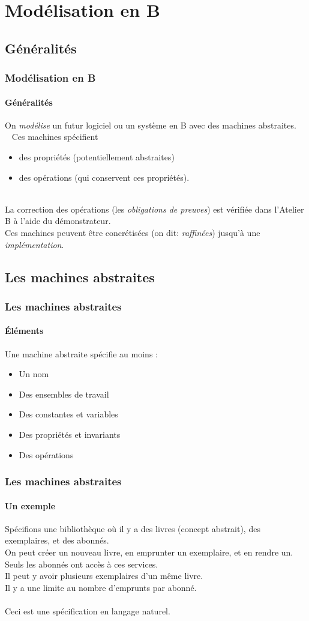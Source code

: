 \documentclass[11pt,a4paper,xcolor=table]{beamer} %
\begin{document}
\section{Modélisation en B}
\subsection{Généralités}
\begin{frame}
\frametitle{Modélisation en B}
\framesubtitle{Généralités}
On \emph{modélise} un futur logiciel ou un système en B avec des machines abstraites.\\[5pt]~\pause
Ces machines spécifient\pause
\begin{itemize}
\item des propriétés (potentiellement abstraites)
\pause
\item des opérations (qui conservent ces propriétés).
\pause
\end{itemize}
~\\[0pt]
La correction des opérations (les \emph{obligations de preuves}) est vérifiée dans l'Atelier B à l'aide du démonstrateur.\pause\\[5pt]
Ces machines peuvent être concrétisées (on dit: \emph{raffinées}) jusqu'à une \emph{implémentation}.
\end{frame}

\subsection{Les machines abstraites}
\begin{frame}
\frametitle{Les machines abstraites}
\framesubtitle{Éléments}
Une machine abstraite spécifie au moins :
\begin{itemize}
\pause
\item Un nom
\pause
\item Des ensembles de travail
\pause
\item Des constantes et variables
\pause
\item Des propriétés et invariants
\pause
\item Des opérations
\end{itemize}
\end{frame}

\begin{frame}
\frametitle{Les machines abstraites}
\framesubtitle{Un exemple}
Spécifions une bibliothèque où il y a des livres (concept abstrait), des exemplaires, et des abonnés.\\\pause
On peut créer un nouveau livre, \pause en emprunter un exemplaire, \pause et en rendre un.
\\\pause Seuls les abonnés ont accès à ces services.
\\\pause Il peut y avoir plusieurs exemplaires d'un même livre.
\\\pause Il y a une limite au nombre d'emprunts par abonné.
\\~\\\pause Ceci est une spécification en langage naturel.
\end{frame}
\end{document}
